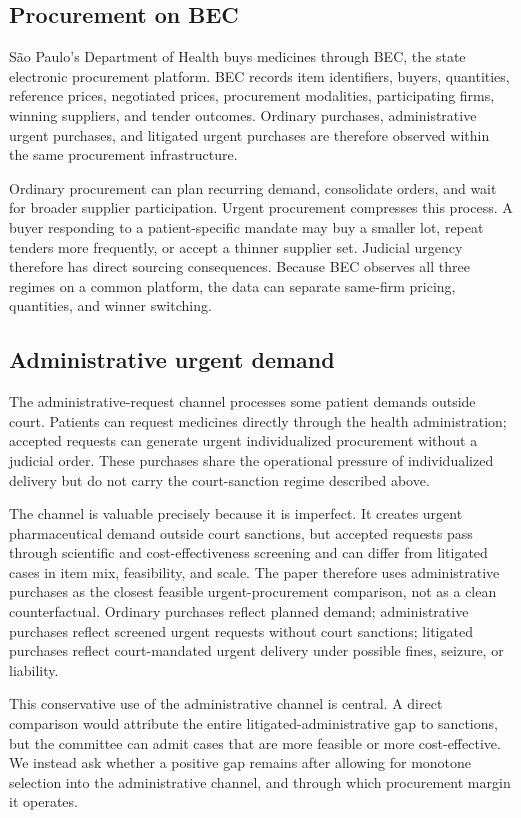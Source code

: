 \subsection{Procurement on BEC}
\label{subsec:bec}

S\~ao Paulo's Department of Health buys medicines through BEC, the
state electronic procurement platform. BEC records item identifiers,
buyers, quantities, reference prices, negotiated prices, procurement
modalities, participating firms, winning suppliers, and tender
outcomes. Ordinary purchases, administrative urgent purchases, and
litigated urgent purchases are therefore observed within the same
procurement infrastructure.

Ordinary procurement can plan recurring demand, consolidate orders,
and wait for broader supplier participation. Urgent procurement
compresses this process. A buyer responding to a patient-specific
mandate may buy a smaller lot, repeat tenders more frequently, or
accept a thinner supplier set. Judicial urgency therefore has direct
sourcing consequences. Because BEC observes all three regimes on a
common platform, the data can separate same-firm pricing, quantities,
and winner switching.

\subsection{Administrative urgent demand}
\label{subsec:admin}

The administrative-request channel processes some patient demands
outside court. Patients can request medicines directly through the
health administration; accepted requests can generate urgent
individualized procurement without a judicial order. These purchases
share the operational pressure of individualized delivery but do not
carry the court-sanction regime described above.

The channel is valuable precisely because it is imperfect. It creates
urgent pharmaceutical demand outside court sanctions, but accepted
requests pass through scientific and cost-effectiveness screening and
can differ from litigated cases in item mix, feasibility, and scale.
The paper therefore uses administrative purchases as the closest
feasible urgent-procurement comparison, not as a clean
counterfactual. Ordinary purchases reflect planned demand;
administrative purchases reflect screened urgent requests without
court sanctions; litigated purchases reflect court-mandated urgent
delivery under possible fines, seizure, or liability.

This conservative use of the administrative channel is central. A
direct comparison would attribute the entire litigated-administrative
gap to sanctions, but the committee can admit cases that are more
feasible or more cost-effective. We instead ask whether a positive
gap remains after allowing for monotone selection into the
administrative channel, and through which procurement margin it
operates.
